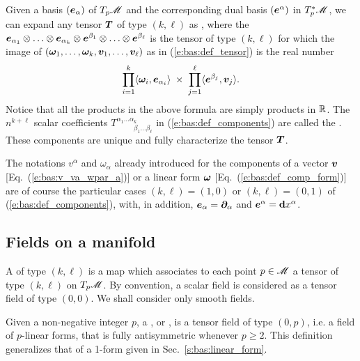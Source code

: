 Given a basis $(\bm{e}_\alpha)$ of $T_p\mathscr{M}$
and the corresponding dual basis $(\bm{e}^\alpha)$ in ${T_p^*\mathscr{M}}$, we
can expand any tensor $\bm{T}$ of type $(k,\ell)$ as
\be \label{e:bas:def_components}
	 ,
\ee
where the  $ \bm{e}_{\alpha_1} \otimes \ldots \otimes \bm{e}_{\alpha_k} \otimes
\bm{e}^{\beta_1} \otimes \ldots \otimes \bm{e}^{\beta_\ell}$ is the tensor of
type $(k,\ell)$ for which the image of  $(\bm{\omega}_1,\ldots,\bm{\omega}_k,\bm{v}_1,\ldots,\bm{v}_\ell)$ as in
(\ref{e:bas:def_tensor}) is the real number
\[
	\prod_{i=1}^k \langle \bm{\omega}_i,\bm{e}_{\alpha_i}\rangle \;\times\;
	\prod_{j=1}^\ell \langle \bm{e}^{\beta_j},\bm{v}_j\rangle .
\]
Notice that all the products in the above formula are simply products in $\mathbb{R}$.
The $n^{k+\ell}$ scalar coefficients  $T^{\alpha_1\ldots\alpha_k}_{\qquad\ \; \beta_1\ldots\beta_\ell}$ in (\ref{e:bas:def_components}) are called the .
These components are unique and fully characterize
the tensor $\bm{T}$.

\begin{remark}
The notations $v^\alpha$ and $\omega_\alpha$ already introduced for the components
of a vector $\bm{v}$ [Eq.~(\ref{e:bas:v_va_wpar_a})]
or a linear form $\bm{\omega}$ [Eq.~(\ref{e:bas:def_comp_form})] are of course the
particular cases $(k,\ell)=(1,0)$ or $(k,\ell)=(0,1)$ of (\ref{e:bas:def_components}), with,
in addition, $\bm{e}_\alpha=\bm{\partial}_\alpha$ and $\bm{e}^\alpha = \mathbf{d} x^\alpha$.
\end{remark}


\subsection{Fields on a manifold} \label{s:bas:fields}

A  of type $(k,\ell)$ is a map
which associates to each point $p\in\mathscr{M}$ a tensor of type $(k,\ell)$ on $T_p\mathscr{M}$.
By convention, a scalar field is considered as a tensor field of type $(0,0)$.
We shall consider only smooth fields.

Given a non-negative integer $p$, a
,
or
, is a tensor field of type $(0,p)$, i.e.
a field of $p$-linear forms, that is fully antisymmetric whenever $p\geq 2$.
This definition generalizes that of a 1-form given in Sec.~\ref{s:bas:linear_form}.

